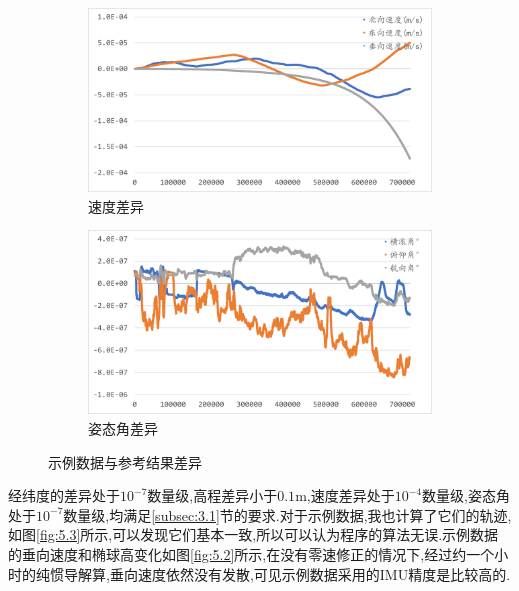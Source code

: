 \documentclass[10pt,a4paper]{ctexart}
\begin{document}
\begin{figure}[H]
{        \begin{subfigure}{0.49\textwidth}
            \centering
            \includegraphics[width=\linewidth]{Figures/DataFigure/示例数据速度差异.png}
            \caption*{速度差异}
        \end{subfigure}\hfill
        \begin{subfigure}{0.49\textwidth}
            \centering
            \includegraphics[width=\linewidth]{Figures/DataFigure/示例数据姿态角差异.png}
            \caption*{姿态角差异}
        \end{subfigure}
    }
    \caption{示例数据与参考结果差异}
    \label{fig:5.1}
\end{figure}
\noindent 经纬度的差异处于$10^{-7}$数量级,高程差异小于$0.1$m,速度差异处于$10^{-4}$数量级,姿态角处于$10^{-7}$数量级,均满足\ref{subsec:3.1}节的要求.对于示例数据,我也计算了它们的轨迹,如图\ref{fig:5.3}所示,可以发现它们基本一致,所以可以认为程序的算法无误.示例数据的垂向速度和椭球高变化如图\ref{fig:5.2}所示,在没有零速修正的情况下,经过约一个小时的纯惯导解算,垂向速度依然没有发散,可见示例数据采用的\textsf{IMU}精度是比较高的.
\end{document}
